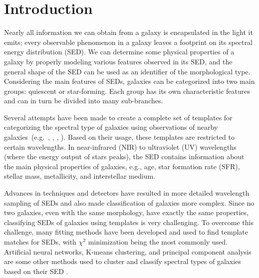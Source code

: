 \section{Introduction}
\label{sec: intro}
Nearly all information we can obtain from a galaxy is encapsulated in the light it emits; every observable phenomenon in a galaxy leaves a footprint on its spectral energy distribution (SED).
We can determine some physical properties of a galaxy by properly modeling various features observed in its SED, and the general shape of the SED can be used as an identifier of the morphological type.
Considering the main features of SEDs, galaxies can be categorized into two main groups: quiescent or star-forming.
Each group has its own characteristic features and can in turn be divided into many sub-branches.

Several attempts have been made to create a complete set of templates for categorizing the spectral type of galaxies using observations of nearby galaxies~(e.g.~\citealt{Kinney93}, \citealt[][hereafter ]{Kinney96}, \citealt{Bershady00}, \citealt{Mannucci01}). 
Based on their usage, these templates are restricted to certain wavelengths.
In near-infrared (NIR) to ultraviolet (UV) wavelengths (where the energy output of stars peaks), the SED contains information about the main physical properties of galaxies, e.g., age, star formation rate (SFR), stellar mass, metallicity, and interstellar medium.



Advances in techniques and detectors have resulted in more detailed wavelength sampling of SEDs and also made classification of galaxies more complex.
Since no two galaxies, even with the same morphology, have exactly the same properties, classifying SEDs of galaxies using templates is very challenging.
To overcome this challenge, many fitting methods have been developed and used to find template matches for SEDs, with $\chi^2$ minimization being the most commonly used. 
Artificial neural networks, K-means clustering, and principal component analysis are some other methods used to cluster and classify spectral types of galaxies based on their SED \citep[e.g.][]{Allen13,Ordov14,Shi15}.

